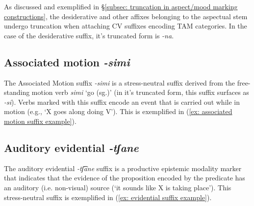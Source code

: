 As discussed and exemplified in §\ref{subsec: truncation in aspect/mood marking constructions}, the desiderative and other affixes belonging to the aspectual stem undergo truncation when attaching CV suffixes encoding TAM categories. In the case of the desiderative suffix, it's truncated form is \textit{-na}.

\subsection{Associated motion \textit{-simi}}
\label{subsec: associated motion}

The Associated Motion suffix \textit{-simi} is a stress-neutral suffix derived from the free-standing motion verb \textit{simi} ‘go (sg.)’ (in it's truncated form, this suffix surfaces as \textit{-si}). Verbs marked with this suffix encode an event that is carried out while in motion (e.g., ‘X goes along doing V’). This is exemplified in (\ref{ex: associated motion suffix example}).

\ea\label{ex: associated motion suffix example}

    \z
\z

\subsection{Auditory evidential \textit{-tʃane}}
\label{subsec: auditory evidential}

The auditory evidential \textit{-tʃ͡ane} suffix is a productive epistemic modality marker that indicates that the evidence of the proposition encoded by the predicate has an auditory (i.e. non-visual) source (‘it sounds like X is taking place’). This stress-neutral suffix is exemplified in (\ref{ex: evidential suffix example}).

